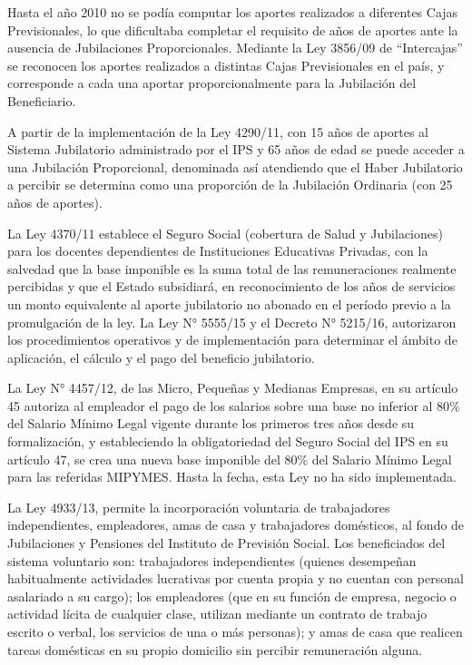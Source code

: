 Hasta el año 2010 no se podía computar los aportes realizados a diferentes Cajas Previsionales, lo que dificultaba completar el requisito de años de aportes ante la ausencia de Jubilaciones Proporcionales.  Mediante la Ley 3856/09 de “Intercajas” se reconocen los aportes realizados a distintas Cajas Previsionales en el país, y corresponde a cada una aportar proporcionalmente para la Jubilación del Beneficiario.

A partir de la implementación de la Ley 4290/11, con 15 años de aportes al Sistema Jubilatorio administrado por el IPS y 65 años de edad se puede acceder a una Jubilación Proporcional, denominada así atendiendo que el Haber Jubilatorio a percibir se determina como una proporción de la Jubilación Ordinaria (con 25 años de aportes).

La Ley 4370/11 establece el Seguro Social (cobertura de Salud y Jubilaciones) para los docentes dependientes de Instituciones Educativas Privadas, con la salvedad que la base imponible es la suma total de las remuneraciones realmente percibidas y que el Estado subsidiará, en reconocimiento de los años de servicios un monto equivalente al aporte jubilatorio no abonado en el período previo a la promulgación de la ley. La Ley N° 5555/15 y el Decreto N° 5215/16, autorizaron los procedimientos operativos y de implementación para determinar el ámbito de aplicación, el cálculo y el pago del beneficio jubilatorio.

La Ley N° 4457/12, de las Micro, Pequeñas y Medianas Empresas, en su artículo 45 autoriza al empleador el pago de los salarios sobre una base no inferior al 80\% del Salario Mínimo Legal vigente durante los primeros tres años desde su formalización, y estableciendo la obligatoriedad del Seguro Social del IPS en su artículo 47, se crea una nueva base imponible del 80\% del Salario Mínimo Legal para las referidas MIPYMES. Hasta la fecha, esta Ley no ha sido implementada.

La Ley 4933/13, permite la incorporación voluntaria de trabajadores independientes, empleadores, amas de casa y trabajadores domésticos, al fondo de Jubilaciones y Pensiones del Instituto de Previsión Social. Los beneficiados del sistema voluntario son: trabajadores independientes (quienes desempeñan habitualmente actividades lucrativas por cuenta propia y no cuentan con personal asalariado a su cargo); los empleadores (que en su función de empresa, negocio o actividad lícita de cualquier clase, utilizan mediante un contrato de trabajo escrito o verbal, los servicios de una o más personas); y amas de casa que realicen tareas domésticas en su propio domicilio sin percibir remuneración alguna.

